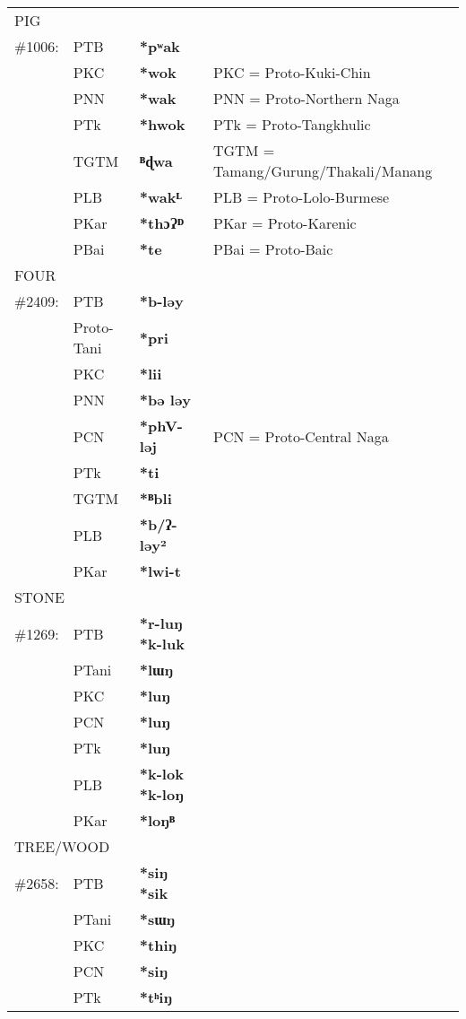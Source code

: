 \begin{tabular}{l l l p{3.25in}}
\multicolumn{4}{l}{PIG}   \\
\#1006: & PTB & \textbf{*pʷak} \\
 & PKC & \textbf{*wok} & PKC = Proto-Kuki-Chin \\
 & PNN & \textbf{*wak}  & PNN = Proto-Northern Naga \\
 & PTk & \textbf{*hwok} & PTk = Proto-Tangkhulic \\
 & TGTM & \textbf{ᴮɖwa} & TGTM = Tamang/\allowbreak{}Gurung/\allowbreak{}Thakali/\allowbreak{}Manang \\
 & PLB & \textbf{*wakᴸ} & PLB = Proto-Lolo-Burmese \\
 & PKar & \textbf{*thɔɁᴰ} & PKar = Proto-Karenic \\
 & PBai & \textbf{*te} & PBai = Proto-Baic \\

\multicolumn{4}{l}{FOUR} \\
\#2409: & PTB & \textbf{*b-ləy} \\
 & Proto-Tani & \textbf{*pri} \\
 & PKC & \textbf{*lii} \\
 & PNN & \textbf{*bə ləy} \\
 & PCN & \textbf{*phV-ləj} & PCN = Proto-Central Naga\\
 & PTk & \textbf{*ti} \\
 & TGTM & \textbf{*ᴮbli} \\
 & PLB & \textbf{*b/ʔ-ləy²} \\
 & PKar & \textbf{*lwi-t} \\

\multicolumn{4}{l}{STONE} \\
\#1269: & PTB & \textbf{*r-luŋ} \STEDTU{⪤} \textbf{*k-luk} \\
 & PTani & \textbf{*lɯŋ} \\
 & PKC & \textbf{*luŋ} \\
 & PCN & \textbf{*luŋ} \\
 & PTk & \textbf{*luŋ} \\
 & PLB & \textbf{*k-lok} \STEDTU{⪤} \textbf{*k-loŋ} \\
 & PKar & \textbf{*loŋᴮ} \\

\multicolumn{4}{l}{TREE/WOOD} \\
\#2658: & PTB & \textbf{*siŋ} \STEDTU{⪤} \textbf{*sik} \\
 & PTani & \textbf{*sɯŋ} \\
 & PKC & \textbf{*thiŋ} \\
 & PCN & \textbf{*siŋ} \\
 & PTk & \textbf{*tʰiŋ} \\


\end{tabular}
